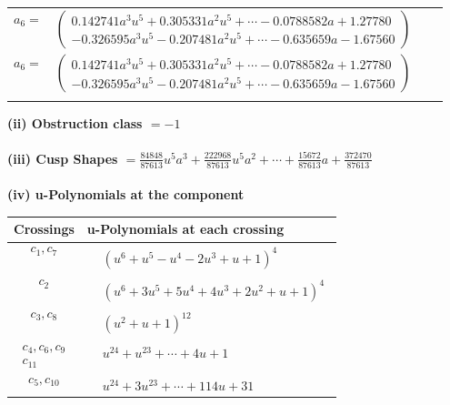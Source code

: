 \documentclass[1p]{elsarticle_modified}
\theoremstyle{definition}
\begin{document}
\begin{tabular}{m{7pt} m{180pt} m{7pt} m{180pt} }
\flushright $a_{6}=$&$\begin{pmatrix}0.142741 a^{3} u^{5}+0.305331 a^{2} u^{5}+\cdots-0.0788582 a+1.27780\\-0.326595 a^{3} u^{5}-0.207481 a^{2} u^{5}+\cdots-0.635659 a-1.67560\end{pmatrix}$\\ \flushright $a_{6}=$&$\begin{pmatrix}0.142741 a^{3} u^{5}+0.305331 a^{2} u^{5}+\cdots-0.0788582 a+1.27780\\-0.326595 a^{3} u^{5}-0.207481 a^{2} u^{5}+\cdots-0.635659 a-1.67560\end{pmatrix}$\\&\end{tabular}
\flushleft \textbf{(ii) Obstruction class $= -1$}\\~\\
\flushleft \textbf{(iii) Cusp Shapes $= \frac{84848}{87613} u^5 a^3+\frac{222968}{87613} u^5 a^2+\cdots+\frac{15672}{87613} a+\frac{372470}{87613}$}\\~\\
\newpage\renewcommand{\arraystretch}{1}
\flushleft \textbf{(iv) u-Polynomials at the component}\newline \\
\begin{tabular}{m{50pt}|m{274pt}}
Crossings & \hspace{64pt}u-Polynomials at each crossing \\
\hline $$\begin{aligned}c_{1},c_{7}\end{aligned}$$&$\begin{aligned}
&(u^6+u^5- u^4-2 u^3+u+1)^4
\end{aligned}$\\
\hline $$\begin{aligned}c_{2}\end{aligned}$$&$\begin{aligned}
&(u^6+3 u^5+5 u^4+4 u^3+2 u^2+u+1)^4
\end{aligned}$\\
\hline $$\begin{aligned}c_{3},c_{8}\end{aligned}$$&$\begin{aligned}
&(u^2+u+1)^{12}
\end{aligned}$\\
\hline $$\begin{aligned}c_{4},c_{6},c_{9}\\c_{11}\end{aligned}$$&$\begin{aligned}
&u^{24}+u^{23}+\cdots+4 u+1
\end{aligned}$\\
\hline $$\begin{aligned}c_{5},c_{10}\end{aligned}$$&$\begin{aligned}
&u^{24}+3 u^{23}+\cdots+114 u+31
\end{aligned}$\\
\hline
\end{tabular}\\~\\
\end{document}
